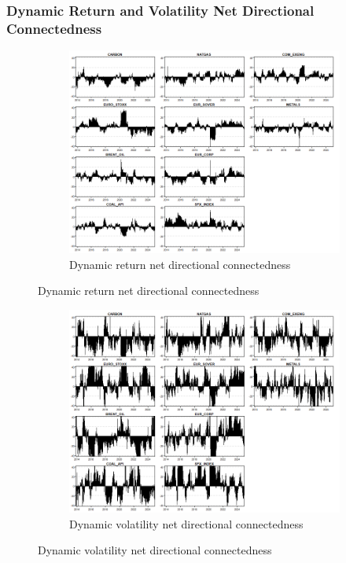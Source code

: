 \documentclass[preprint, 3p,
authoryear]{elsarticle} %
\begin{document}
\begin{landscape}
\subsubsection{Dynamic Return and Volatility Net Directional Connectedness}

\begin{figure}[H]
  \caption{Dynamic Net Directional Connectedness (Jan 2013 – Jan 2025)}
    \centering
      \begin{subfigure}[a]{\textwidth}
        \caption{Dynamic return net directional connectedness}
        \includegraphics[width = 1.25\linewidth]{17aApdxD-8-200-RetNDC}
      \end{subfigure}
\end{figure}
\begin{figure}[H]
  \ContinuedFloat
  \centering
      \begin{subfigure}[b]{\textwidth}
        \caption{Dynamic volatility net directional connectedness}
        \includegraphics[width = 1.25\linewidth]{17bApdxD-8-200-VolNDC}
      \end{subfigure}
\end{figure}




\end{landscape}
\end{document}
